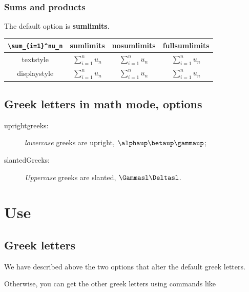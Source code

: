 \documentclass[a4paper,11pt]{article}
\renewcommand{\arraystretch}{1.3}
\begin{document}
\renewcommand{\arraystretch}{1.3}

\subsubsection{Sums and products}

The default option is \textbf{sumlimits}.


\renewcommand{\arraystretch}{1.8}

\begin{center}\begin{tabular}{|c||c|c|c|}\hline
\verb+\sum_{i=1}^nu_n+&\textbf{sumlimits}&\textbf{nosumlimits}&\textbf{fullsumlimits}\\\hline\hline
textstyle&$\sum_{i=1}^nu_n$&$\sum_{i=1}^nu_n$&\rule[-3ex]{0pt}{7ex}$\sum\limits_{i=1}^nu_n$\\\hline
displaystyle&$\displaystyle\sum_{i=1}^nu_n$&$\displaystyle\sum\nolimits_{i=1}^nu_n$&\rule[-4ex]{0pt}{9ex}$\displaystyle\sum_{i=1}^nu_n$\\\hline
\end{tabular}\end{center}

\renewcommand{\arraystretch}{1.3}

\subsection{Greek letters in math mode, options}

\begin{description}
	\item[uprightgreeks:] \textit{lowercase} greeks are upright, $\alphaup\betaup\gammaup$;
	\item[slantedGreeks:] \textit{Uppercase} greeks are slanted, $\Gammasl\Deltasl$. 
\end{description}

\section{Use}

\subsection{Greek letters}

We have described above the two options that alter the default greek letters. 

Otherwise, you can get the other greek letters using commands like 
\end{document}
